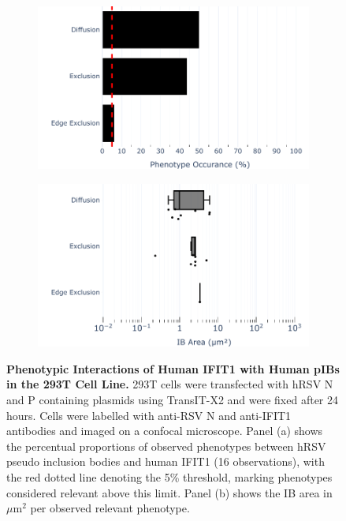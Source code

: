 \begin{figure}
    \begin{subfigure}{0.495\textwidth}
        \caption{}
        \includegraphics[width=1\linewidth]{09. Chapter 4/Figs/01. pIB/02. IFIT1/01. bar_i1_293t.pdf} 
    \end{subfigure}
    \begin{subfigure}{0.495\textwidth}
        \caption{}
        \includegraphics[width=1\linewidth]{09. Chapter 4/Figs/01. pIB/02. IFIT1/02. box_i1_293t.pdf}
    \end{subfigure}
    \caption[Phenotypic Interactions of Human IFIT1 with Human pIBs in the 293T Cell Line.]{\textbf{Phenotypic Interactions of Human IFIT1 with Human pIBs in the 293T Cell Line.} 293T cells were transfected with hRSV N and P containing plasmids using TransIT-X2 and were fixed after 24 hours. Cells were labelled with anti-RSV N and anti-IFIT1 antibodies and imaged on a confocal microscope. Panel (a) shows the percentual proportions of observed phenotypes between hRSV pseudo inclusion bodies and human IFIT1 (16 observations), with the red dotted line denoting the 5\% threshold, marking phenotypes considered relevant above this limit. Panel (b) shows the IB area in \(\mu \mbox{m}^2\) per observed relevant phenotype.}
    \label{fig:Phenotypic Interactions of Human IFIT1 with Human pIBs in the 293T Cell Line}
\end{figure}

